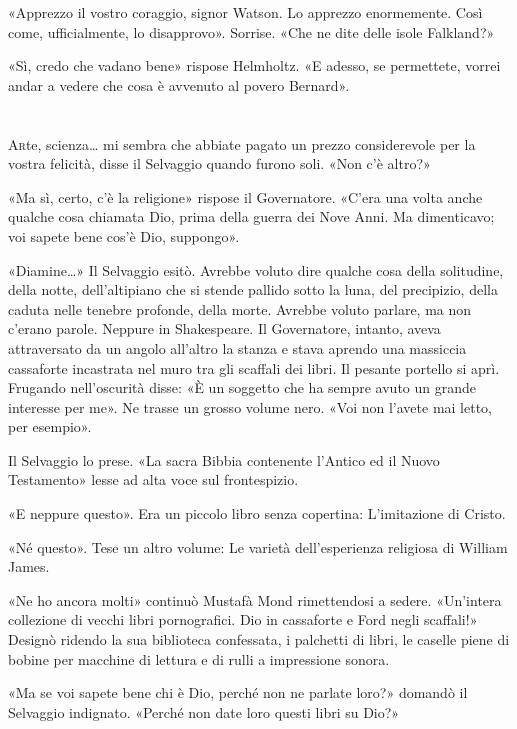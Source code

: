 \documentclass[
a5paper, %
10pt, %
twoside, 
onecolumn, %
openany, %
]{memoir}
\begin{document}
«Apprezzo il vostro coraggio, signor Watson. Lo apprezzo enormemente. Così come, ufficialmente, lo disapprovo». Sorrise. «Che ne dite delle isole Falkland?»

«Sì, credo che vadano bene» rispose Helmholtz. «E adesso, se permettete, vorrei andar a vedere che cosa è avvenuto al povero Bernard».

\chapter{\phantom{title}}

\lettrine{A}rte, scienza… mi sembra che abbiate pagato un prezzo considerevole per la vostra felicità, disse il Selvaggio quando furono soli. «Non c’è altro?»

«Ma sì, certo, c’è la religione» rispose il Governatore. «C’era una volta anche qualche cosa chiamata Dio, prima della guerra dei Nove Anni. Ma dimenticavo; voi sapete bene cos’è Dio, suppongo».

«Diamine…» Il Selvaggio esitò. Avrebbe voluto dire qualche cosa della solitudine, della notte, dell’altipiano che si stende pallido sotto la luna, del precipizio, della caduta nelle tenebre profonde, della morte. Avrebbe voluto parlare, ma non c’erano parole. Neppure in Shakespeare. Il Governatore, intanto, aveva attraversato da un angolo all’altro la stanza e stava aprendo una massiccia cassaforte incastrata nel muro tra gli scaffali dei libri. Il pesante portello si aprì. Frugando nell’oscurità disse: «È un soggetto che ha sempre avuto un grande interesse per me». Ne trasse un grosso volume nero. «Voi non l’avete mai letto, per esempio».

Il Selvaggio lo prese. «La sacra Bibbia contenente l’Antico ed il Nuovo Testamento» lesse ad alta voce sul frontespizio.

«E neppure questo». Era un piccolo libro senza copertina: L’imitazione di Cristo.

«Né questo». Tese un altro volume: Le varietà dell’esperienza religiosa di William James.

«Ne ho ancora molti» continuò Mustafà Mond rimettendosi a sedere. «Un’intera collezione di vecchi libri pornografici. Dio in cassaforte e Ford negli scaffali!» Designò ridendo la sua biblioteca confessata, i palchetti di libri, le caselle piene di bobine per macchine di lettura e di rulli a impressione sonora.

«Ma se voi sapete bene chi è Dio, perché non ne parlate loro?» domandò il Selvaggio indignato. «Perché non date loro questi libri su Dio?»
\end{document}
